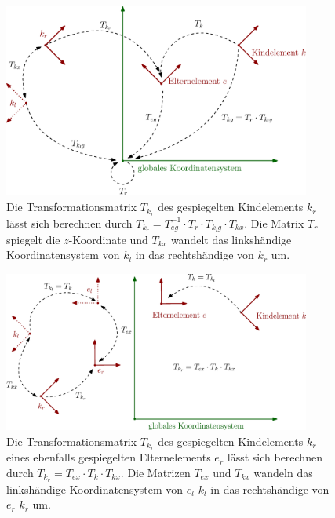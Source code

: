\begin{figure}
 \centering
 \includegraphics[width=0.9\textwidth]{graphics/transformation_matrices_non_mirrored_parent}
 \caption{Die Transformationsmatrix $T_{k_r}$ des gespiegelten Kindelements $k_r$ lässt sich berechnen durch $T_{k_r} = T_{eg}^{-1} \cdot T_r \cdot T_{k_lg} \cdot T_{kx}$. Die Matrix $T_r$ spiegelt die $z$-Koordinate und $T_{kx}$ wandelt das linkshändige Koordinatensystem von $k_l$ in das rechtshändige von $k_r$ um.}
 \label{transformation_matrix_non_mirrored_parent}
\end{figure}

\begin{figure}
 \centering
 \includegraphics[width=0.9\textwidth]{graphics/transformation_matrices_mirrored_parent}
 \caption{Die Transformationsmatrix $T_{k_r}$ des gespiegelten Kindelements $k_r$ eines ebenfalls gespiegelten Elternelements $e_r$ lässt sich berechnen durch $T_{k_r} = T_{ex} \cdot T_k \cdot T_{kx}$. Die Matrizen $T_{ex}$ und $T_{kx}$ wandeln das linkshändige Koordinatensystem von $e_l$ \bzw $k_l$ in das rechtshändige von $e_r$ \bzw $k_r$ um.}
 \label{transformation_matrix_mirrored_parent}
\end{figure}


